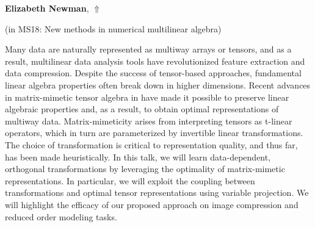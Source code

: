 \documentclass[ILAS2025-program.tex]{subfiles}
\begin{document}
\hypertarget{down0039}{}\begin{ilasabstract}
    
\textbf{Elizabeth Newman},  \hfill \hyperlink{up0039}{$\Uparrow$}
    
    
(in {\color{mstitle}MS18: New methods in numerical multilinear algebra})
        
\mtskip
    Many data are naturally represented as multiway arrays or tensors, and as a result, multilinear data analysis tools have revolutionized feature extraction and data compression. Despite the success of tensor-based approaches, fundamental linear algebra properties often break down in higher dimensions. Recent advances in matrix-mimetic tensor algebra in have made it possible to preserve linear algebraic properties and, as a result, to obtain optimal representations of multiway data. Matrix-mimeticity arises from interpreting tensors as t-linear operators, which in turn are parameterized by invertible linear transformations. The choice of transformation is critical to representation quality, and thus far, has been made heuristically. In this talk, we will learn data-dependent, orthogonal transformations by leveraging the optimality of matrix-mimetic representations. In particular, we will exploit the coupling between transformations and optimal tensor representations using variable projection. We will highlight the efficacy of our proposed approach on image compression and reduced order modeling tasks.

\end{ilasabstract}
    
\end{document}
